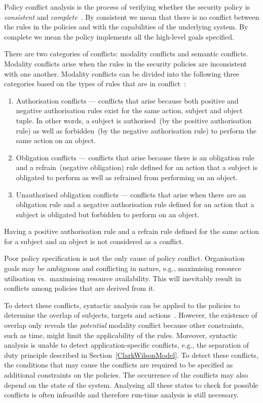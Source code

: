 Policy conflict analysis is the process of verifying whether the
security policy is \emph{consistent} and
\emph{complete}~\cite{MS94}. By consistent we mean that there is no
conflict between the rules in the policies and with the capabilities
of the underlying system. By complete we mean the policy implements
all the high-level goals specified.

There are two categories of conflicts: modality conflicts and semantic
conflicts. Modality conflicts arise when the rules in the security
policies are inconsistent with one another. Modality conflicts can be
divided into the following three categories based on the types of
rules that are in conflict~\cite{EL99}:
\begin{enumerate}
\item Authorisation conflicts --- conflicts that arise because both
  positive and negative authorisation rules exist for the same action,
  subject and object tuple. In other words, a subject is
  authorised~(by the positive authorisation rule) as well as
  forbidden~(by the negative authorisation rule) to perform the same
  action on an object.
\item Obligation conflicts --- conflicts that arise because there is
  an obligation rule and a refrain~(negative obligation) rule defined
  for an action that a subject is obligated to perform as well as
  refrained from performing on an object.
\item Unauthorised obligation conflicts --- conflicts that arise
  when there are an obligation rule and a negative authorisation rule
  defined for an action that a subject is obligated but forbidden to
  perform on an object.
\end{enumerate}
Having a positive authorisation rule and a refrain rule defined for
the same action for a subject and an object is not considered as a
conflict.

Poor policy specification is not the only cause of policy
conflict. Organisation goals may be ambiguous and conflicting in
nature, e.g., maximising resource utilisation vs.\ maximising resource
availability. This will inevitably result in conflicts among policies
that are derived from it.
 
To detect these conflicts, syntactic analysis can be applied to the
policies to determine the overlap of subjects, targets and
actions~\cite{EL99}. However, the existence of overlap only reveals
the \emph{potential} modality conflict because other constraints, such
as time, might limit the applicability of the rules. Moreover,
syntactic analysis is unable to detect application-specific conflicts,
e.g., the separation of duty principle described in
Section~\ref{ClarkWilsonModel}. To detect these conflicts, the
conditions that may cause the conflicts are required to be specified
as additional constraints on the policies. The occurrence of the
conflicts may also depend on the state of the system. Analysing all
these states to check for possible conflicts is often infeasible and
therefore run-time analysis is still necessary.

